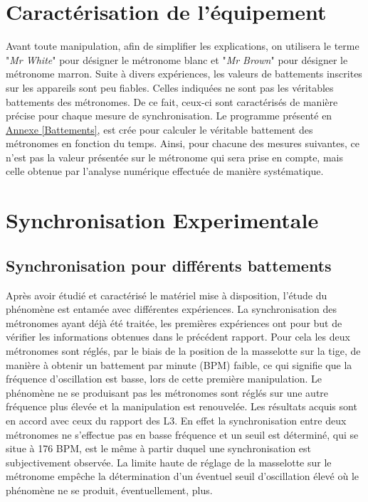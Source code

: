 \documentclass[a4paper,11pt]{report}
\begin{document}
\section{Caractérisation de l'équipement}
Avant toute manipulation, afin de simplifier les explications, on utilisera le terme "{\it Mr White}" pour désigner le métronome blanc et "{\it Mr Brown}" pour désigner le métronome marron. Suite à divers expériences, les valeurs de battements inscrites sur les appareils sont peu fiables. Celles indiquées ne sont pas les véritables battements des métronomes. De ce fait, ceux-ci sont caractérisés de manière précise pour chaque mesure de synchronisation. Le programme présenté en \underline{Annexe \ref{Battements}}, est crée pour calculer le véritable battement des métronomes en fonction du temps. Ainsi, pour chacune des mesures suivantes, ce n'est pas la valeur présentée sur le métronome qui sera prise en compte, mais celle obtenue par l'analyse numérique effectuée de manière systématique.

\section{Synchronisation Experimentale}

\subsection{Synchronisation pour différents battements}
Après avoir étudié et caractérisé le matériel mise à disposition, l'étude du phénomène est entamée avec différentes expériences. La synchronisation des métronomes ayant déjà été traitée, les premières expériences ont pour but de vérifier les informations obtenues dans le précédent rapport. Pour cela les deux métronomes sont réglés, par le biais de la position de la masselotte sur la tige, de manière à obtenir un battement par minute (BPM) faible, ce qui signifie que la fréquence d'oscillation est basse, lors de cette première manipulation. Le phénomène ne se produisant pas les métronomes sont réglés sur une autre fréquence plus élevée et la manipulation est renouvelée. Les résultats acquis sont en accord avec ceux du rapport des L3\cite{ram}. En effet la synchronisation entre deux métronomes ne s'effectue pas en basse fréquence et un seuil est déterminé, qui se situe à 176 BPM, est le même à partir duquel une synchronisation est subjectivement observée. La limite haute de réglage de la masselotte sur le métronome empêche la détermination d'un éventuel seuil d'oscillation élevé où le phénomène ne se produit, éventuellement, plus.\\
\end{document}
